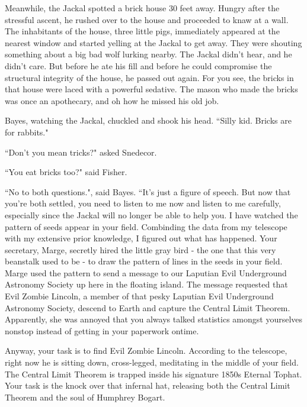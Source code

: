 \documentclass{article}
\begin{document}
Meanwhile, the Jackal spotted a brick house 30 feet away. Hungry after the stressful ascent, he rushed over to the house and proceeded to knaw at a wall. The inhabitants of the house, three little pigs, immediately appeared at the nearest window and started yelling at the Jackal to get away. They were shouting something about a big bad wolf lurking nearby. The Jackal didn't hear, and he didn't care. But before he ate his fill and before he could compromise the structural integrity of the house, he passed out again. For you see, the bricks in that house were laced with a powerful sedative. The mason who made the bricks was once an apothecary, and oh how he missed his old job. \newline

Bayes, watching the Jackal, chuckled and shook his head. ``Silly kid. Bricks are for rabbits." \newline

``Don't you mean tricks?" asked Snedecor. \newline

``You eat bricks too?" said Fisher. \newline

``No to both questions.", said Bayes. ``It's just a figure of speech. But now that you're both settled, you need to listen to me now and listen to me carefully, especially since the Jackal will no longer be able to help you. I have watched the pattern of seeds appear in your field. Combinding the data from my telescope with my extensive prior knowledge, I figured out what has happened. Your secretary, Marge, secretly hired the little gray bird - the one that this very beanstalk used to be - to draw the pattern of lines in the seeds in your field. Marge used the pattern to send a message to our Laputian Evil Underground Astronomy Society up here in the floating island. The message requested that Evil Zombie Lincoln, a member of that pesky Laputian Evil Underground Astronomy Society, descend to Earth and capture the Central Limit Theorem. Apparently, she was annoyed that you always talked statistics amongst yourselves nonstop instead of getting in your paperwork ontime. \newline

Anyway, your task is to find Evil Zombie Lincoln. According to the telescope, right now he is sitting down, cross-legged, meditating in the middle of your field. The Central Limit Theorem is trapped inside his signature 1850s Eternal Tophat. Your task is the knock over that infernal hat, releasing both the Central Limit Theorem and the soul of Humphrey Bogart. \newline
\end{document}
